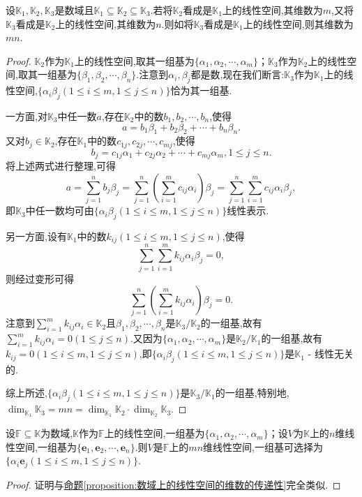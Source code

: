 \documentclass[../../main.tex]{subfiles}
\begin{document}
\begin{proposition}\label{proposition:数域上的线性空间的维数的传递性}
设\(\mathbb{K}_1,\mathbb{K}_2,\mathbb{K}_3\)是数域且\(\mathbb{K}_1\subseteq\mathbb{K}_2\subseteq\mathbb{K}_3\).若将\(\mathbb{K}_2\)看成是\(\mathbb{K}_1\)上的线性空间,其维数为\(m\),又将\(\mathbb{K}_3\)看成是\(\mathbb{K}_2\)上的线性空间,其维数为\(n\).则如将\(\mathbb{K}_3\)看成是\(\mathbb{K}_1\)上的线性空间,则其维数为\(mn\).
\end{proposition}
\begin{proof}
\(\mathbb{K}_2\)作为\(\mathbb{K}_1\)上的线性空间,取其一组基为\(\{\alpha_1,\alpha_2,\cdots,\alpha_m\}\)；\(\mathbb{K}_3\)作为\(\mathbb{K}_2\)上的线性空间,取其一组基为\(\{\beta_1,\beta_2,\cdots,\beta_n\}\).注意到\(\alpha_i,\beta_j\)都是数,现在我们断言:\(\mathbb{K}_3\)作为\(\mathbb{K}_1\)上的线性空间,\(\{\alpha_i\beta_j(1\leq i\leq m,1\leq j\leq n)\}\)恰为其一组基.

一方面,对\(\mathbb{K}_3\)中任一数\(a\),存在\(\mathbb{K}_2\)中的数\(b_1,b_2,\cdots,b_n\),使得
\[
a = b_1\beta_1 + b_2\beta_2+\cdots + b_n\beta_n.
\]
又对\(b_j\in\mathbb{K}_2\),存在\(\mathbb{K}_1\)中的数\(c_{1j},c_{2j},\cdots,c_{mj}\),使得
\[
b_j = c_{1j}\alpha_1 + c_{2j}\alpha_2+\cdots + c_{mj}\alpha_m,1\leq j\leq n.
\]
将上述两式进行整理,可得
\[
a=\sum_{j = 1}^{n}b_j\beta_j=\sum_{j = 1}^{n}\left(\sum_{i = 1}^{m}c_{ij}\alpha_i\right)\beta_j=\sum_{j = 1}^{n}\sum_{i = 1}^{m}c_{ij}\alpha_i\beta_j,
\]
即\(\mathbb{K}_3\)中任一数均可由\(\{\alpha_i\beta_j(1\leq i\leq m,1\leq j\leq n)\}\)线性表示.

另一方面,设有\(\mathbb{K}_1\)中的数\(k_{ij}(1\leq i\leq m,1\leq j\leq n)\),使得
\[
\sum_{j = 1}^{n}\sum_{i = 1}^{m}k_{ij}\alpha_i\beta_j = 0,
\]
则经过变形可得
\[
\sum_{j = 1}^{n}\left(\sum_{i = 1}^{m}k_{ij}\alpha_i\right)\beta_j = 0.
\]
注意到\(\sum_{i = 1}^{m}k_{ij}\alpha_i\in\mathbb{K}_2\)且\(\beta_1,\beta_2,\cdots,\beta_n\)是\(\mathbb{K}_3/\mathbb{K}_2\)的一组基,故有\(\sum_{i = 1}^{m}k_{ij}\alpha_i = 0(1\leq j\leq n)\).又因为\(\{\alpha_1,\alpha_2,\cdots,\alpha_m\}\)是\(\mathbb{K}_2/\mathbb{K}_1\)的一组基,故有\(k_{ij}=0(1\leq i\leq m,1\leq j\leq n)\),即\(\{\alpha_i\beta_j(1\leq i\leq m,1\leq j\leq n)\}\)是\(\mathbb{K}_1\) - 线性无关的.

综上所述,\(\{\alpha_i\beta_j(1\leq i\leq m,1\leq j\leq n)\}\)是\(\mathbb{K}_3/\mathbb{K}_1\)的一组基,特别地,\(\dim_{\mathbb{K}_1}\mathbb{K}_3=mn=\dim_{\mathbb{K}_1}\mathbb{K}_2\cdot\dim_{\mathbb{K}_2}\mathbb{K}_3\).
\end{proof}

\begin{proposition}\label{proposition:数域上的线性空间的基的传递性}
设\(\mathbb{F}\subseteq\mathbb{K}\)为数域,\(\mathbb{K}\)作为\(\mathbb{F}\)上的线性空间,一组基为\(\{\alpha_1,\alpha_2,\cdots,\alpha_m\}\)；设\(V\)为\(\mathbb{K}\)上的\(n\)维线性空间,一组基为\(\{\boldsymbol{e}_1,\boldsymbol{e}_2,\cdots,\boldsymbol{e}_n\}\).则\(V\)是\(\mathbb{F}\)上的\(mn\)维线性空间,一组基可选择为\(\{\alpha_i\boldsymbol{e}_j(1\leq i\leq m,1\leq j\leq n)\}\).
\end{proposition}
\begin{proof}
证明与\hyperref[proposition:数域上的线性空间的维数的传递性]{命题\ref{proposition:数域上的线性空间的维数的传递性}}完全类似.
\end{proof}
\end{document}
